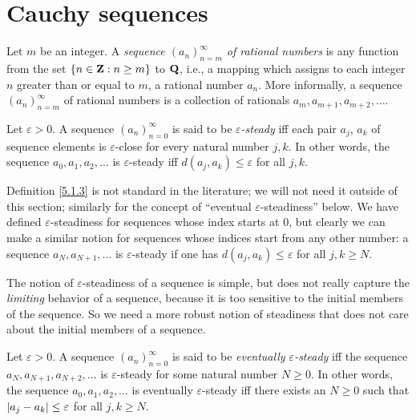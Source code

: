\section{Cauchy sequences}\label{sec 5.1}

\begin{definition}[Sequences]\label{5.1.1}
    Let \(m\) be an integer.
    A \emph{sequence \((a_n)_{n = m}^{\infty}\) of rational numbers} is any function from the set \(\{n \in \mathbf{Z} : n \geq m\}\) to \(\mathbf{Q}\), i.e., a mapping which assigns to each integer \(n\) greater than or equal to \(m\), a rational number \(a_n\).
    More informally, a sequence \((a_n)_{n = m}^{\infty}\) of rational numbers is a collection of rationals \(a_m, a_{m + 1}, a_{m + 2}, \dots\).
\end{definition}

\setcounter{theorem}{2}
\begin{definition}\label{5.1.3}
    Let \(\varepsilon > 0\).
    A sequence \((a_n)_{n = 0}^{\infty}\) is said to be \emph{\(\varepsilon\)-steady} iff each pair \(a_j\), \(a_k\) of sequence elements is \(\varepsilon\)-close for every natural number \(j, k\).
    In other words, the sequence \(a_0, a_1, a_2, \dots\) is \(\varepsilon\)-steady iff \(d(a_j, a_k) \leq \varepsilon\) for all \(j, k\).
\end{definition}

\begin{remark}\label{5.1.4}
    Definition \ref{5.1.3} is not standard in the literature;
    we will not need it outside of this section;
    similarly for the concept of ``eventual \(\varepsilon\)-steadiness'' below.
    We have defined \(\varepsilon\)-steadiness for sequences whose index starts at \(0\), but clearly we can make a similar notion for sequences whose indices start from any other number:
    a sequence \(a_N, a_{N + 1}, \dots\) is \(\varepsilon\)-steady if one has \(d(a_j, a_k) \leq \varepsilon\) for all \(j, k \geq N\).
\end{remark}

\begin{note}
    The notion of \(\varepsilon\)-steadiness of a sequence is simple, but does not really capture the \emph{limiting} behavior of a sequence, because it is too sensitive to the initial members of the sequence.
    So we need a more robust notion of steadiness that does not care about the initial members of a sequence.
\end{note}

\setcounter{theorem}{5}
\begin{definition}\label{5.1.6}
    Let \(\varepsilon > 0\).
    A sequence \((a_n)_{n = 0}^{\infty}\) is said to be \emph{eventually \(\varepsilon\)-steady} iff the sequence \(a_N, a_{N + 1}, a_{N + 2}, \dots\) is \(\varepsilon\)-steady for some natural number \(N \geq 0\).
    In other words, the sequence \(a_0, a_1, a_2, \dots\) is eventually \(\varepsilon\)-steady iff there exists an \(N \geq 0\) such that \(\left\lvert a_j - a_k\right\rvert \leq \varepsilon\) for all \(j, k \geq N\).
\end{definition}

